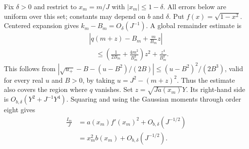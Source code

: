 \documentclass[aps,pra,reprint,superscriptaddress,longbibliography]{revtex4-2}
\theoremstyle{remark}
\begin{document}
Fix $\delta>0$ and restrict to $x_m=m/J$ with
$|x_m|\leq1-\delta$. All errors below are uniform over this set;
constants may depend on $b$ and $\delta$. Put
$f(x)=\sqrt{1-x^2}$. Centered expansion gives
$k_m-B_m=O_\delta(J^{-1})$. A global remainder estimate is
\begin{equation}
\begin{aligned}
&\left|q(m+z)-B_m+\frac{m}{B_m}z\right|\\
&\quad\leq\left(\frac1{2B_m}+\frac{4m^2}{B_m^3}\right)z^2
             +\frac{z^4}{B_m^3}.
\end{aligned}
\label{eq:q-taylor}
\end{equation}
This follows from
$|\sqrt{u_+}-B-(u-B^2)/(2B)|\leq(u-B^2)^2/(2B^3)$,
valid for every real $u$ and $B>0$, by taking
$u=J^2-(m+z)^2$. Thus the estimate also covers the region where
$q$ vanishes. Set $z=\sqrt{Ja(x_m)}Y$. Its right-hand side is
$O_{b,\delta}(Y^2+J^{-1}Y^4)$. Squaring and using the Gaussian
moments through order eight gives
\begin{equation}
\begin{aligned}
\frac{I_m}{J}
 &=a(x_m)f'(x_m)^2+O_{b,\delta}(J^{-1/2})\\
 &=x_m^2b(x_m)+O_{b,\delta}(J^{-1/2}).
\end{aligned}
\label{eq:I-limit}
\end{equation}
\end{document}
